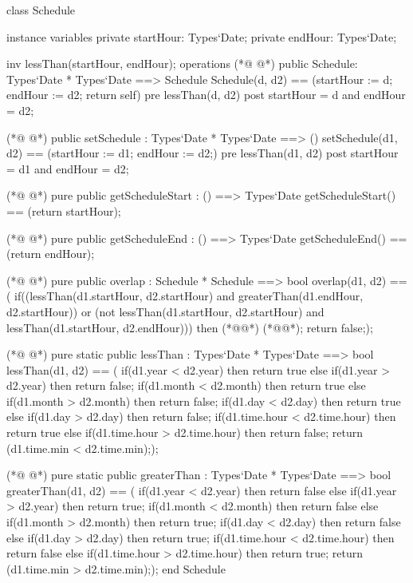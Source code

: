 \begin{vdmpp}[breaklines=true]
class Schedule

instance variables
  private startHour: Types`Date;
  private endHour: Types`Date;
  
  inv lessThan(startHour, endHour);
operations 
(*@
\label{Schedule:9}
@*)
 public Schedule: Types`Date * Types`Date ==> Schedule
  Schedule(d, d2) == (startHour := d; endHour := d2; return self)
 pre lessThan(d, d2)
 post startHour = d and endHour = d2;
 
(*@
\label{setSchedule:14}
@*)
 public setSchedule : Types`Date * Types`Date ==> ()
  setSchedule(d1, d2) == (startHour := d1; endHour := d2;)
 pre lessThan(d1, d2)
 post startHour = d1 and endHour = d2;
  
(*@
\label{getScheduleStart:19}
@*)
 pure public getScheduleStart : () ==> Types`Date
  getScheduleStart() == (return startHour);
  
(*@
\label{getScheduleEnd:22}
@*)
 pure public getScheduleEnd : () ==> Types`Date
  getScheduleEnd() == (return endHour);
 
(*@
\label{overlap:25}
@*)
 pure public overlap : Schedule * Schedule ==> bool
  overlap(d1, d2) == (
          if((lessThan(d1.startHour, d2.startHour) and greaterThan(d1.endHour, d2.startHour)) or
          (not lessThan(d1.startHour, d2.startHour) and lessThan(d1.startHour, d2.endHour)))
           then (*@@*) (*@@*);
          return false;);

(*@
\label{lessThan:32}
@*)
 pure static public lessThan : Types`Date * Types`Date ==> bool
  lessThan(d1, d2) == (
          if(d1.year < d2.year)
           then return true
          else if(d1.year > d2.year)
           then return false;
          if(d1.month < d2.month)
           then return true
          else if(d1.month > d2.month)
           then return false;
          if(d1.day < d2.day)
           then return true
          else if(d1.day > d2.day)
           then return false;
          if(d1.time.hour < d2.time.hour)
           then return true
          else if(d1.time.hour > d2.time.hour)
           then return false;
          return (d1.time.min < d2.time.min););
          
(*@
\label{greaterThan:52}
@*)
 pure static public greaterThan : Types`Date * Types`Date ==> bool
  greaterThan(d1, d2) == (
          if(d1.year < d2.year)
           then return false
          else if(d1.year > d2.year)
           then return true;
          if(d1.month < d2.month)
           then return false
          else if(d1.month > d2.month)
           then return true;
          if(d1.day < d2.day)
           then return false
          else if(d1.day > d2.day)
           then return true;
          if(d1.time.hour < d2.time.hour)
           then return false
          else if(d1.time.hour > d2.time.hour)
           then return true;
          return (d1.time.min > d2.time.min););
end Schedule
\end{vdmpp}
